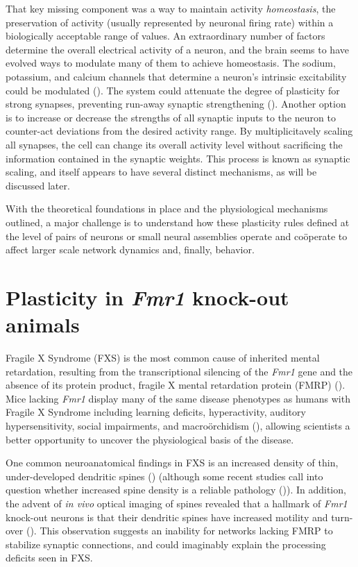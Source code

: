 That key missing component was a way to maintain activity \textit{homeostasis}, the preservation of activity (usually represented by neuronal firing rate) within a biologically acceptable range of values. An extraordinary number of factors determine the overall electrical activity of a neuron, and the brain seems to have evolved ways to modulate many of them to achieve homeostasis. The sodium, potassium, and calcium channels that determine a neuron's intrinsic excitability could be modulated (\cite{Franklin1992}). The system could attenuate the degree of plasticity for strong synapses, preventing run-away synaptic strengthening (\cite{VanRossum2000}). Another option is to increase or decrease the strengths of all synaptic inputs to the neuron to counter-act deviations from the desired activity range. By multiplicitavely scaling all synapses, the cell can change its overall activity level without sacrificing the information contained in the synaptic weights. This process is known as synaptic scaling, and itself appears to have several distinct mechanisms, as will be discussed later.

With the theoretical foundations in place and the physiological mechanisms outlined, a major challenge is to understand how these plasticity rules defined at the level of pairs of neurons or small neural assemblies operate and co\"operate to affect larger scale network dynamics and, finally, behavior.

\section{Plasticity in \textit{Fmr1} knock-out animals}

Fragile X Syndrome (FXS) is the most common cause of inherited mental retardation, resulting from the transcriptional silencing of the \textit{Fmr1} gene and the absence of its protein product, fragile X mental retardation protein (FMRP) (\cite{Bailey1998, Jin2003}). Mice lacking \textit{Fmr1} display many of the same disease phenotypes as humans with Fragile X Syndrome including learning deficits, hyperactivity, auditory hypersensitivity, social impairments, and macro\"orchidism (\cite{DutchBelgianFragileXConsortium1994, Bernardet2006, Moy2008}), allowing scientists a better opportunity to uncover the physiological basis of the disease.

One common neuroanatomical findings in FXS is an increased density of thin, under-developed dendritic spines (\cite{Hinton1991, Comery1997, Dolen2007, Liu2011}) (although some recent studies call into question whether increased spine density is a reliable pathology (\cite{Cruz-Martin2010, Harlow2010, Meredith2007})). In addition, the advent of \textit{in vivo} optical imaging of spines revealed that a hallmark of \textit{Fmr1} knock-out neurons is that their dendritic spines have increased motility and turn-over (\cite{Cruz-Martin2010, Pan2010}). This observation suggests an inability for networks lacking FMRP to stabilize synaptic connections, and could imaginably explain the processing deficits seen in FXS.

